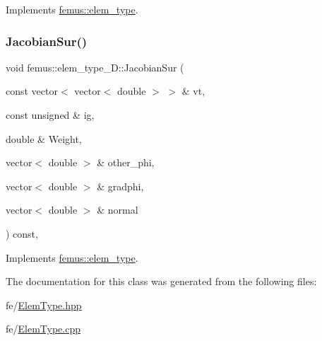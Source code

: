 Implements \mbox{\hyperlink{classfemus_1_1elem__type_a293052fac0f51472150b1bf7365c6b18}{femus\+::elem\+\_\+type}}.

\mbox{\label{classfemus_1_1elem__type__3_d_a35ed7904fbe1fdc2998819384d709bdb}} 
\subsubsection{\texorpdfstring{Jacobian\+Sur()}{JacobianSur()}\hspace{0.1cm}{\footnotesize\ttfamily [2/2]}}
{\footnotesize\ttfamily void femus\+::elem\+\_\+type\+\_\+D\+::\+Jacobian\+Sur (\begin{DoxyParamCaption}\item[{const vector$<$ vector$<$ double $>$ $>$ \&}]{vt,  }\item[{const unsigned \&}]{ig,  }\item[{double \&}]{Weight,  }\item[{vector$<$ double $>$ \&}]{other\+\_\+phi,  }\item[{vector$<$ double $>$ \&}]{gradphi,  }\item[{vector$<$ double $>$ \&}]{normal }\end{DoxyParamCaption}) const\hspace{0.3cm}{\ttfamily [inline]}, {\ttfamily [virtual]}}



Implements \mbox{\hyperlink{classfemus_1_1elem__type_aee56bc66a4d90ae7f7669bf7fa9ed8d7}{femus\+::elem\+\_\+type}}.



The documentation for this class was generated from the following files\+:\begin{DoxyCompactItemize}
\item 
fe/\mbox{\hyperlink{_elem_type_8hpp}{Elem\+Type.\+hpp}}\item 
fe/\mbox{\hyperlink{_elem_type_8cpp}{Elem\+Type.\+cpp}}\end{DoxyCompactItemize}
